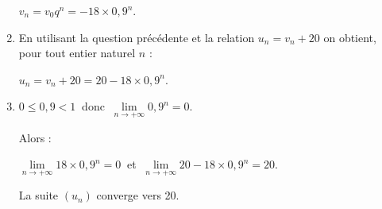 \begin{corrige}
\begin{enumerate}
          $v_n=v_0q^n=-18 \times 0,9^n$.
          \item %
          En utilisant la question précédente et la relation $u_n=v_n+20$ on obtient, pour tout entier naturel $n$ :
          \par
          $u_n=v_n+20=20-18 \times 0,9^n$.
          \item %
          ${0 \leqslant 0,9 < 1}\ $ donc $\ \lim\limits_{n \rightarrow +\infty } 0,9^n = 0$.
          \par
          Alors :
          \par
          $\lim\limits_{n \rightarrow +\infty}18 \times 0,9^n = 0\ $ et $\ \lim\limits_{n \rightarrow +\infty}20-18 \times 0,9^n = 20$.
          \par
          La suite $(u_n)$ converge vers 20.
          \par
          \par
     \end{enumerate}
\end{corrige}
